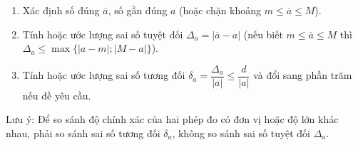 \begin{enumerate}
\item Xác định số đúng $\overline{a}$, số gần đúng $a$ (hoặc chặn khoảng $m \le \overline{a} \le M$).
\item Tính hoặc ước lượng sai số tuyệt đối $\Delta_a = |\overline{a} - a|$ (nếu biết $m \le \overline{a} \le M$ thì $\Delta_a \le \max\{|a-m|; |M-a|\}$).
\item Tính hoặc ước lượng sai số tương đối $\delta_a = \dfrac{\Delta_a}{|a|} \le \dfrac{d}{|a|}$ và đổi sang phần trăm nếu đề yêu cầu.
\end{enumerate}
Lưu ý: Để so sánh độ chính xác của hai phép đo có đơn vị hoặc độ lớn khác nhau, phải so sánh sai số tương đối $\delta_a$, không so sánh sai số tuyệt đối $\Delta_a$.
